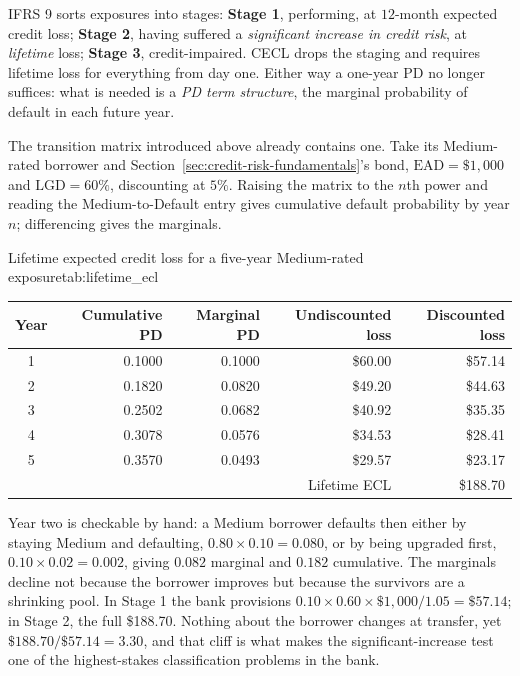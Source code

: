 \documentclass[../ai_in_finance]{subfiles}
\begin{document}
IFRS 9 sorts exposures into stages: \textbf{Stage 1}, performing, at $12$-month expected credit loss; \textbf{Stage 2}, having suffered a \emph{significant increase in credit risk}, at \emph{lifetime} loss; \textbf{Stage 3}, credit-impaired. CECL drops the staging and requires lifetime loss for everything from day one. Either way a one-year PD no longer suffices: what is needed is a \emph{PD term structure}, the marginal probability of default in each future year.

The transition matrix introduced above already contains one. Take its Medium-rated borrower and Section~\ref{sec:credit-risk-fundamentals}'s bond, $\text{EAD}=\$1{,}000$ and $\text{LGD}=60\%$, discounting at $5\%$. Raising the matrix to the $n$th power and reading the Medium-to-Default entry gives cumulative default probability by year $n$; differencing gives the marginals.

\begin{booktable}[htbp]{Lifetime expected credit loss for a five-year Medium-rated exposure}{tab:lifetime_ecl}
\begin{tabular}{crrrr}
\toprule
Year & Cumulative PD & Marginal PD & Undiscounted loss & Discounted loss \\
\midrule
1 & 0.1000 & 0.1000 & \$60.00 & \$57.14 \\
2 & 0.1820 & 0.0820 & \$49.20 & \$44.63 \\
3 & 0.2502 & 0.0682 & \$40.92 & \$35.35 \\
4 & 0.3078 & 0.0576 & \$34.53 & \$28.41 \\
5 & 0.3570 & 0.0493 & \$29.57 & \$23.17 \\
\midrule
\multicolumn{4}{r}{Lifetime ECL} & \$188.70 \\
\bottomrule
\end{tabular}
\end{booktable}

Year two is checkable by hand: a Medium borrower defaults then either by staying Medium and defaulting, $0.80\times0.10=0.080$, or by being upgraded first, $0.10\times0.02=0.002$, giving $0.082$ marginal and $0.182$ cumulative. The marginals decline not because the borrower improves but because the survivors are a shrinking pool. In Stage 1 the bank provisions $0.10\times0.60\times\$1{,}000/1.05 = \$57.14$; in Stage 2, the full \$188.70. Nothing about the borrower changes at transfer, yet $\$188.70/\$57.14 = 3.30$, and that cliff is what makes the significant-increase test one of the highest-stakes classification problems in the bank.
\end{document}

